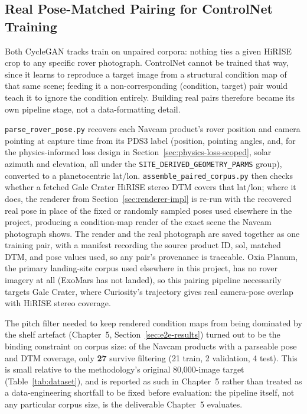 \subsection{Real Pose-Matched Pairing for ControlNet Training}
\label{sec:posepairing-impl}

Both CycleGAN tracks train on unpaired corpora: nothing ties a given HiRISE crop to any specific rover photograph. ControlNet cannot be trained that way, since it learns to reproduce a target image from a structural condition map of that same scene; feeding it a non-corresponding (condition, target) pair would teach it to ignore the condition entirely. Building real pairs therefore became its own pipeline stage, not a data-formatting detail.

\texttt{parse\_rover\_pose.py} recovers each Navcam product's rover position and camera pointing at capture time from its PDS3 label (position, pointing angles, and, for the physics-informed loss design in Section~\ref{sec:physics-loss-scoped}, solar azimuth and elevation, all under the \texttt{SITE\_DERIVED\_GEOMETRY\_PARMS} group), converted to a planetocentric lat/lon. \texttt{assemble\_paired\_corpus.py} then checks whether a fetched Gale Crater HiRISE stereo DTM covers that lat/lon; where it does, the renderer from Section~\ref{sec:renderer-impl} is re-run with the recovered real pose in place of the fixed or randomly sampled poses used elsewhere in the project, producing a condition-map render of the exact scene the Navcam photograph shows. The render and the real photograph are saved together as one training pair, with a manifest recording the source product ID, sol, matched DTM, and pose values used, so any pair's provenance is traceable. Oxia Planum, the primary landing-site corpus used elsewhere in this project, has no rover imagery at all (ExoMars has not landed), so this pairing pipeline necessarily targets Gale Crater, where Curiosity's trajectory gives real camera-pose overlap with HiRISE stereo coverage.

The pitch filter needed to keep rendered condition maps from being dominated by the shelf artefact (Chapter~5, Section~\ref{sec:e2e-results}) turned out to be the binding constraint on corpus size: of the Navcam products with a parseable pose and DTM coverage, only \textbf{27} survive filtering (21 train, 2 validation, 4 test). This is small relative to the methodology's original 80,000-image target (Table~\ref{tab:dataset}), and is reported as such in Chapter~5 rather than treated as a data-engineering shortfall to be fixed before evaluation: the pipeline itself, not any particular corpus size, is the deliverable Chapter~5 evaluates.

